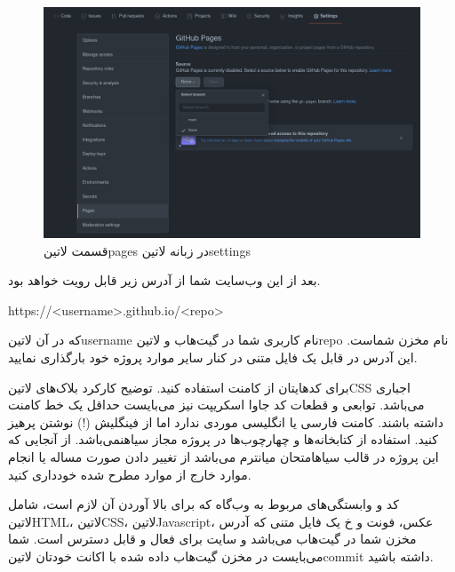 \documentclass[../main.tex]{subfiles}
\begin{document}
\begin{figure}[h]
  \centering
  \includegraphics[scale=0.3]{./github-step-2}
  \caption{قسمت ‌لاتین{pages} در زبانه ‌لاتین{settings}}
\end{figure}

بعد از این وب‌سایت شما از آدرس زیر قابل رویت خواهد بود.

\begin{latin}\begin{center}
https://<username>.github.io/<repo>
\end{center}\end{latin}

که در آن ‌لاتین{username} نام کاربری شما در گیت‌هاب و ‌لاتین{repo} نام مخزن شماست. این آدرس در قابل یک فایل متنی در کنار سایر موارد پروژه خود بارگذاری نمایید.


 برای کدهایتان از کامنت استفاده کنید. توضیح کارکرد بلاک‌های ‌لاتین{CSS} اجباری می‌باشد. توابعی و قطعات کد جاوا اسکریپت نیز می‌بایست حداقل یک خط کامنت داشته باشند.
 کامنت فارسی یا انگلیسی موردی ندارد اما از فینگلیش (!) نوشتن پرهیز کنید.
 استفاده از کتابخانه‌ها و چهارچوب‌ها در پروژه مجاز ‌سیاه{نمی‌باشد}.
 از آنجایی که این پروژه در قالب ‌سیاه{امتحان میانترم} می‌باشد از تغییر دادن صورت مساله یا انجام موارد خارج از موارد مطرح شده خودداری کنید.


 کد و وابستگی‌های مربوط به وب‌گاه که برای بالا آوردن آن لازم است، شامل ‌لاتین{HTML}، ‌لاتین{CSS}، ‌لاتین{Javascript}، عکس، فونت و ‌خ
 یک فایل متنی که آدرس مخزن شما در گیت‌هاب می‌باشد و سایت برای فعال و قابل دسترس است.
 شما می‌بایست در مخزن گیت‌هاب داده شده با اکانت خودتان ‌لاتین{commit} داشته باشید.
\end{document}
